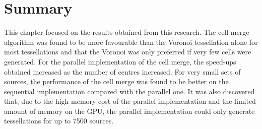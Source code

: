 \section{Summary}
This chapter focused on the results obtained from this research. The cell merge algorithm was found to be more favourable than the Voronoi tessellation alone for most tessellations and that the Voronoi was only preferred if very few cells were generated. For the parallel implementation of the cell merge, the speed-ups obtained increased as the number of centres increased. For very small sets of sources, the performance of the cell merge was found to be better on the sequential implementation compared with the parallel one. It was also discovered that, due to the high memory cost of the parallel implementation and the limited amount of memory on the GPU, the parallel implementation could only generate tessellations for up to 7500 sources.